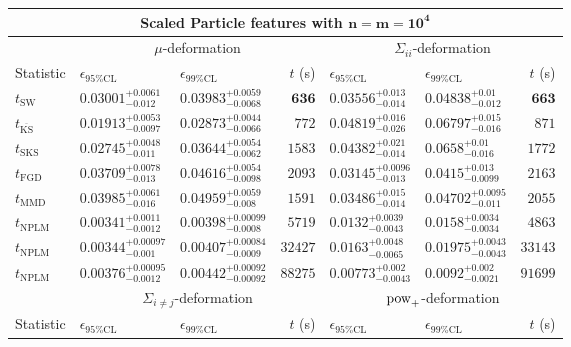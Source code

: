\begin{tabular}{l|llr|llr}
	\toprule
	\multicolumn{7}{c}{{\bf Scaled Particle features with $\mathbf{n=m=10^{4}}$}} \\
	\toprule
	\multicolumn{1}{c}{} & \multicolumn{3}{c}{$\mu$-deformation} & \multicolumn{3}{c}{$\Sigma_{ii}$-deformation} \\
	Statistic & $\epsilon_{95\%\mathrm{CL}}$ & $\epsilon_{99\%\mathrm    {CL}}$ & $t$ (s) & $\epsilon_{95\%\mathrm{CL}}$ & $\epsilon_{99\%\mathrm{CL}}$ & $t$ (s) \\
	\midrule
	$t_{\mathrm{SW}}$ & $0.03001_{-0.012}^{+0.0061}$ & $0.03983_{-0.0068}^{+0.0059}$ & ${\mathbf{636}}$ & $0.03556_{-0.014}^{+0.013}$ & $0.04838_{-0.012}^{+0.01}$ & ${\mathbf{663}}$ \\
	$t_{\overline{\mathrm{KS}}}$ & ${\mathbf{0.01913_{-0.0097}^{+0.0053}}}$ & ${\mathbf{0.02873_{-0.0066}^{+0.0044}}}$ & $772$ & $0.04819_{-0.026}^{+0.016}$ & $0.06797_{-0.016}^{+0.015}$ & $871$ \\
	$t_{\mathrm{SKS}}$ & $0.02745_{-0.011}^{+0.0048}$ & $0.03644_{-0.0062}^{+0.0054}$ & $1583$ & $0.04382_{-0.014}^{+0.021}$ & $0.0658_{-0.016}^{+0.01}$ & $1772$ \\
	$t_{\mathrm{FGD}}$ & $0.03709_{-0.013}^{+0.0078}$ & $0.04616_{-0.0098}^{+0.0054}$ & $2093$ & ${\mathbf{0.03145_{-0.013}^{+0.0096}}}$ & ${\mathbf{0.0415_{-0.0099}^{+0.013}}}$ & $2163$ \\
	$t_{\mathrm{MMD}}$ & $0.03985_{-0.016}^{+0.0061}$ & $0.04959_{-0.008}^{+0.0059}$ & $1591$ & $0.03486_{-0.014}^{+0.015}$ & $0.04702_{-0.011}^{+0.0095}$ & $2055$ \\
\rowcolor{red!35}	$t_{\mathrm{NPLM}}$ & $0.00341_{-0.0012}^{+0.0011}$ & $0.00398_{-0.0008}^{+0.00099}$ & $5719$ & $0.0132_{-0.0043}^{+0.0039}$ & $0.0158_{-0.0034}^{+0.0034}$ & $4863$ \\
\rowcolor{blue!35}	$t_{\mathrm{NPLM}}$ & $0.00344_{-0.001}^{+0.00097}$ & $0.00407_{-0.0009}^{+0.00084}$ & $32427$ & $0.0163_{-0.0065}^{+0.0048}$ & $0.01975_{-0.0043}^{+0.0043}$ & $33143$ \\
\rowcolor{green!35}	$t_{\mathrm{NPLM}}$ & $0.00376_{-0.0012}^{+0.00095}$ & $0.00442_{-0.00092}^{+0.00092}$ & $88275$ & $0.00773_{-0.0043}^{+0.002}$ & $0.0092_{-0.0021}^{+0.002}$ & $91699$ \\
	\toprule
	\multicolumn{1}{c}{} & \multicolumn{3}{c}{$\Sigma_{i\neq j}$-deformation} & \multicolumn{3}{c}{$\rm{pow}_{+}$-deformation} \\
Statistic & $\epsilon_{95\%\mathrm{CL}}$ & $\epsilon_{99\%\mathrm{CL}}$ & $t$ (s) & $\epsilon_{95\%\mathrm{CL}}$ & $\epsilon_{99\%\mathrm{CL}}$ & $t$ (s) \\

\end{tabular}
